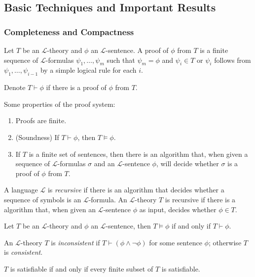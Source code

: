 \documentclass[
	fontsize=10pt, %
]{kaohandt}
\begin{document}
\subsection{Basic Techniques and Important Results}
\subsubsection{Completeness and Compactness}
Let $T$ be an $\mathcal{L}$-theory and $\phi$ an $\mathcal{L}$-sentence.
A proof of $\phi$ from $T$ is a finite sequence of $\mathcal{L}$-formulas
$\psi_1,\dots,\psi_m$ such that $\psi_m = \phi$ and $\psi_i \in T$ or 
$\psi_i$ follows from $\psi_1,\dots,\psi_{i-1}$ by a simple logical rule for each $i$.

Denote $T \vdash \phi$ if there is a proof of $\phi$ from $T$.

Some properties of the proof system:
\begin{enumerate}[label = {$\bullet$}]
    \item Proofs are finite.
    \item (Soundness) If $T \vdash \phi$, then $T \models \phi$.
    \item If $T$ is a finite set of sentences, then there is an algorithm that, when given a sequence of $\mathcal{L}$-formulas $\sigma$ and an $\mathcal{L}$-sentence $\phi$, will decide whether $\sigma$ is a proof of $\phi$ from $T$.
\end{enumerate}

A language $\mathcal{L}$ is \emph{recursive} if there is an algorithm that decides whether a sequence of symbols is an $\mathcal{L}$-formula.
An $\mathcal{L}$-theory $T$ is recursive if there is a algorithm that,
when given an $\mathcal{L}$-sentence $\phi$ as input, decides whether $\phi \in T$.

\begin{theorem}
    Let $T$ be an $\mathcal{L}$-theory and $\phi$ an $\mathcal{L}$-sentence, then $T \models \phi$ if and only if $T\vdash \phi$.
\end{theorem}

\begin{definition}
    An $\mathcal{L}$-theory $T$ is \emph{inconsistent} 
    if $T \vdash (\phi \land\neg\phi)$ for some sentence $\phi$;
    otherwise $T$ is \emph{consistent}.
\end{definition}

\begin{theorem}
    $T$ is satisfiable if and only if every finite subset of $T$ is satisfiable.
\end{theorem}
\end{document}
